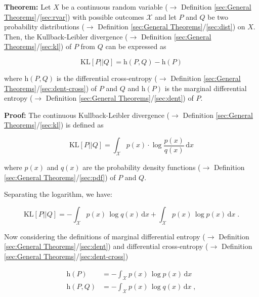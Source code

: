 \documentclass[a4paper,12pt,twoside]{book}
\begin{document}
\textbf{Theorem:} Let $X$ be a continuous random variable ($\rightarrow$ Definition \ref{sec:General Theorems}/\ref{sec:rvar}) with possible outcomes $\mathcal{X}$ and let $P$ and $Q$ be two probability distributions ($\rightarrow$ Definition \ref{sec:General Theorems}/\ref{sec:dist}) on $X$. Then, the Kullback-Leibler divergence ($\rightarrow$ Definition \ref{sec:General Theorems}/\ref{sec:kl}) of $P$ from $Q$ can be expressed as

\begin{equation} \label{eq:kl-dent-kl-dent}
\mathrm{KL}[P||Q] = \mathrm{h}(P,Q) - \mathrm{h}(P)
\end{equation}

where $\mathrm{h}(P,Q)$ is the differential cross-entropy ($\rightarrow$ Definition \ref{sec:General Theorems}/\ref{sec:dent-cross}) of $P$ and $Q$ and $\mathrm{h}(P)$ is the marginal differential entropy ($\rightarrow$ Definition \ref{sec:General Theorems}/\ref{sec:dent}) of $P$.


\vspace{1em}
\textbf{Proof:} The continuous Kullback-Leibler divergence ($\rightarrow$ Definition \ref{sec:General Theorems}/\ref{sec:kl}) is defined as

\begin{equation} \label{eq:kl-dent-KL}
\mathrm{KL}[P||Q] = \int_{\mathcal{X}} p(x) \cdot \log \frac{p(x)}{q(x)} \, \mathrm{d}x
\end{equation}

where $p(x)$ and $q(x)$ are the probability density functions ($\rightarrow$ Definition \ref{sec:General Theorems}/\ref{sec:pdf}) of $P$ and $Q$.

Separating the logarithm, we have:

\begin{equation} \label{eq:kl-dent-KL-dev}
\mathrm{KL}[P||Q] = - \int_{\mathcal{X}} p(x) \, \log q(x) \, \mathrm{d}x + \int_{\mathcal{X}} p(x) \, \log p(x) \, \mathrm{d}x \; .
\end{equation}

Now considering the definitions of marginal differential entropy ($\rightarrow$ Definition \ref{sec:General Theorems}/\ref{sec:dent}) and differential cross-entropy ($\rightarrow$ Definition \ref{sec:General Theorems}/\ref{sec:dent-cross})

\begin{equation} \label{eq:kl-dent-MDE-DCE}
\begin{split}
\mathrm{h}(P) &= - \int_{\mathcal{X}} p(x) \, \log p(x) \, \mathrm{d}x \\
\mathrm{h}(P,Q) &= - \int_{\mathcal{X}} p(x) \, \log q(x) \, \mathrm{d}x \; ,
\end{split}
\end{equation}
\end{document}
